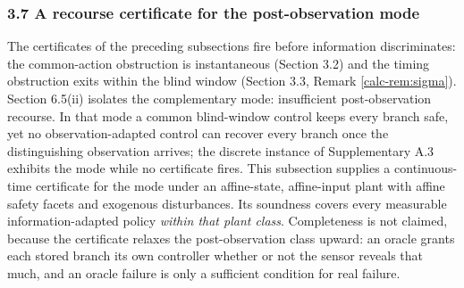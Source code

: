 \documentclass[10pt,twocolumn]{article}
\theoremstyle{definition}
\begin{document}
\subsubsection{3.7 A recourse certificate for the post-observation
mode}\label{calc-recourse-certificate}

The certificates of the preceding subsections fire before information discriminates: the
common-action obstruction is instantaneous (Section 3.2) and the timing
obstruction exits within the blind window (Section 3.3, Remark
\ref{calc-rem:sigma}). Section 6.5(ii) isolates the complementary mode:
insufficient post-observation recourse. In that mode a common blind-window
control keeps every branch safe, yet no observation-adapted control can
recover every branch once the distinguishing observation arrives; the discrete
instance of Supplementary A.3 exhibits the mode while no certificate fires.
This subsection supplies a continuous-time certificate for the mode under
an affine-state, affine-input plant with affine safety facets and exogenous
disturbances. Its soundness covers every measurable information-adapted policy
\emph{within that plant class}. Completeness is
not claimed, because the certificate relaxes the post-observation class
upward: an oracle grants each stored branch its own controller whether or not
the sensor reveals that much, and an oracle failure is only a sufficient
condition for real failure.
\end{document}
